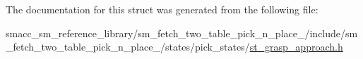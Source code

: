 The documentation for this struct was generated from the following file\+:\begin{DoxyCompactItemize}
\item 
smacc\+\_\+sm\+\_\+reference\+\_\+library/sm\+\_\+fetch\+\_\+two\+\_\+table\+\_\+pick\+\_\+n\+\_\+place\+\_/include/sm\+\_\+fetch\+\_\+two\+\_\+table\+\_\+pick\+\_\+n\+\_\+place\+\_/states/pick\+\_\+states/\hyperlink{sm__fetch__two__table__pick__n__place__1_2include_2sm__fetch__two__table__pick__n__place__1_2staf693a1464160e65301a523813550129b}{st\+\_\+grasp\+\_\+approach.\+h}\end{DoxyCompactItemize}
